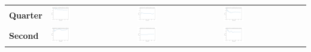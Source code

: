 \begin{tabular}{>{\centering\arraybackslash}m{}>{\centering\arraybackslash}m{}>{\centering\arraybackslash}m{}>{\centering\arraybackslash}m{}}
    \textbf{Quarter} & \includegraphics[width=0.25\textwidth]{images/win_rate_ql_experiment_quarter_yes_vs_random.png} &
    \includegraphics[width=0.25\textwidth]{images/win_rate_ql_experiment_quarter_yes_vs_ql.png} &
    \includegraphics[width=0.25\textwidth]{images/win_rate_ql_experiment_quarter_yes_vs_dqn.png} \\
    \textbf{Second} & \includegraphics[width=0.25\textwidth]{images/win_rate_ql_experiment_second_yes_vs_random.png} &
    \includegraphics[width=0.25\textwidth]{images/win_rate_ql_experiment_second_yes_vs_ql.png} &
    \includegraphics[width=0.25\textwidth]{images/win_rate_ql_experiment_second_yes_vs_dqn.png} \\
  \end{tabular}


